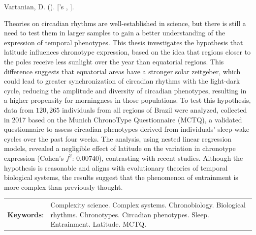 \documentclass[
12pt,
openright,
oneside,
a4paper,
chapter=TITLE,
section=TITLE,
french,
spanish,
brazil,
english
]{abntex2}\usepackage{array}
\renewcommand{\resumoname}{Abstract}
\renewcommand{\resumoname}{Resumo}
\renewcommand{\resumoname}{Resumen}
\renewcommand{\resumoname}{Résumé}
\providecommand{\imprimiruniversidade}{}
\providecommand{\imprimirtipodetituloacademico}{}
\newenvironment{resumoenv}[1][\resumoname]{
  \pretextualchapter{#1}
  \begingroup
  \setlength{\parindent}{0cm}
  \setlength{\parskip}{\smallskipamount} %
  \AtBeginEnvironment{tabular}{\normalsize}
  \renewcommand{\arraystretch}{1}
  \setlength{\aboverulesep}{0ex}
  \setlength{\belowrulesep}{0ex}
  \setlength{\arrayrulewidth}{0pt}
  \setlength{\tabcolsep}{0cm}
  \vspace{-\smallskipamount} %
  \begin{SingleSpace}
}{
  \end{SingleSpace}
  \cleardoublepage
  \endgroup
}
\begin{document}
\begin{resumoenv}[\resumoname]
Vartanian, D. ({\imprimirdata}). \textit{\imprimirtitulo} [{\imprimirtipodetituloacademico}'s {\imprimirtipotrabalho}, {\imprimiruniversidade}].


Theories on circadian rhythms are well-established in science, but there
is still a need to test them in larger samples to gain a better
understanding of the expression of temporal phenotypes. This thesis
investigates the hypothesis that latitude influences chronotype
expression, based on the idea that regions closer to the poles receive
less sunlight over the year than equatorial regions. This difference
suggests that equatorial areas have a stronger solar zeitgeber, which
could lead to greater synchronization of circadian rhythms with the
light-dark cycle, reducing the amplitude and diversity of circadian
phenotypes, resulting in a higher propensity for morningness in those
populations. To test this hypothesis, data from \(120,265\) individuals
from all regions of Brazil were analyzed, collected in 2017 based on the
Munich ChronoType Questionnaire (MCTQ), a validated questionnaire to
assess circadian phenotypes derived from individuals' sleep-wake cycles
over the past four weeks. The analysis, using nested linear regression
models, revealed a negligible effect of latitude on the variation in
chronotype expression (Cohen's \(f^2\): \(0.00740\)), contrasting with
recent studies. Although the hypothesis is reasonable and aligns with
evolutionary theories of temporal biological systems, the results
suggest that the phenomenon of entrainment is more complex than
previously thought.


\begin{tabular}{p{2.3cm} p{13.6cm}}
  \textbf{Keywords}: & Complexity science. Complex systems. Chronobiology. Biological rhythms. Chronotypes. Circadian phenotypes. Sleep. Entrainment. Latitude. MCTQ.
\end{tabular}
\end{resumoenv}

\end{document}

